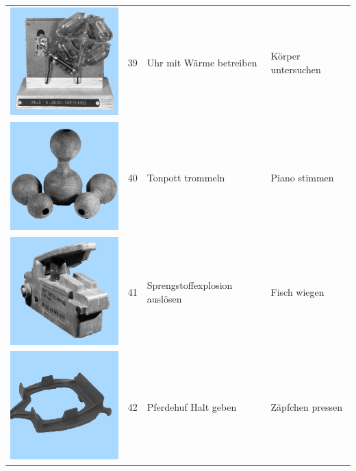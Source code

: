 \documentclass[
  english,
  doc,12pt,twoside,floatsintext]{apa7}
\begin{document}
\begin{center}
\begin{ThreePartTable}
\begin{longtable}{llll}
\includegraphics[valign=c, scale=0.19]{../materials/unfamiliar/39.png} & 39 & Uhr mit Wärme betreiben & Körper untersuchen\\
\includegraphics[valign=c, scale=0.19]{../materials/unfamiliar/40.png} & 40 & Tonpott trommeln & Piano stimmen\\
\includegraphics[valign=c, scale=0.19]{../materials/unfamiliar/41.png} & 41 & Sprengstoffexplosion auslösen & Fisch wiegen\\
\includegraphics[valign=c, scale=0.19]{../materials/unfamiliar/42.png} & 42 & Pferdehuf Halt geben & Zäpfchen pressen\\

\end{longtable}
\end{ThreePartTable}
\end{center}
\end{document}
